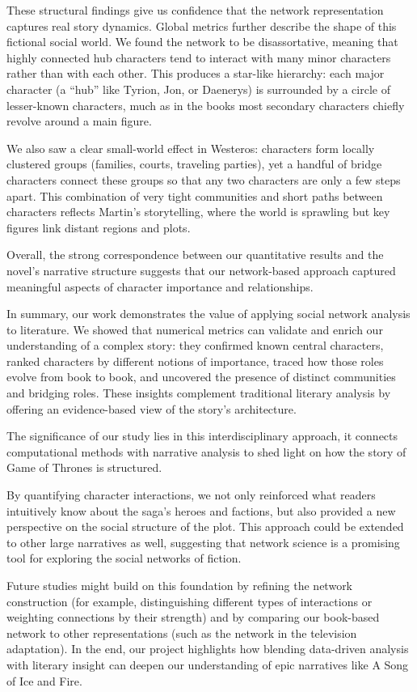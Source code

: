 \documentclass[12pt, a4paper]{article}
\begin{document}
 These structural findings give us confidence that the network representation captures real story dynamics. 
 Global metrics further describe the shape of this fictional social world. 
 We found the network to be disassortative, meaning that highly connected hub characters tend to interact with many minor characters rather than with each other. 
 This produces a star-like hierarchy: each major character (a “hub” like Tyrion, Jon, or Daenerys) is surrounded by a circle of lesser-known characters, 
 much as in the books most secondary characters chiefly revolve around a main figure. 

 We also saw a clear small-world effect in Westeros: characters form locally clustered groups 
 (families, courts, traveling parties), yet a handful of bridge characters connect these groups so that any two characters are only a few steps apart. 
 This combination of very tight communities and short paths between characters reflects Martin’s storytelling, 
 where the world is sprawling but key figures link distant regions and plots. 
 
 Overall, the strong correspondence between our quantitative results and the novel’s narrative structure suggests that 
 our network-based approach captured meaningful aspects of character importance and relationships.

In summary, our work demonstrates the value of applying social network analysis to literature. We showed that numerical metrics can validate 
and enrich our understanding of a complex story: 
they confirmed known central characters, ranked characters by different notions of importance, 
traced how those roles evolve from book to book, and uncovered the presence of distinct communities and bridging roles. 
These insights complement traditional literary analysis by offering an evidence-based view of the story’s architecture. 

The significance of our study lies in this interdisciplinary approach, 
it connects computational methods with narrative analysis to shed light on how the story of Game of Thrones is structured. 

By quantifying character interactions, we not only reinforced what readers intuitively know about the saga’s heroes and factions, 
but also provided a new perspective on the social structure of the plot. 
This approach could be extended to other large narratives as well, suggesting that network science is a promising tool for exploring the social networks of fiction.
 

Future studies might build on this foundation by refining the network construction 
 (for example, distinguishing different types of interactions or weighting connections by their strength) 
 and by comparing our book-based network to other representations (such as the network in the television adaptation). 
 In the end, our project highlights how blending data-driven analysis with literary insight can deepen our understanding 
 of epic narratives like A Song of Ice and Fire.
\end{document}
